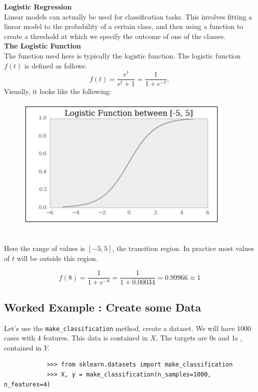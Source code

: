 \documentclass[SKL-MASTER.tex]{subfiles}
\begin{document}
	\LARGE
	\noindent \textbf{Logistic Regression}\\
	Linear models can actually be used for classification tasks. This involves fitting a linear model
	to the probability of a certain class, and then using a function to create a threshold at which
	we specify the outcome of one of the classes. \\ 
	
	\bigskip
	\noindent \textbf{The Logistic Function}\\
	The function used here is typically the logistic function. The logistic function $f(t)$ is defined as follows:
	\[ f (t) = \frac{e^t}{e^t+1} = \frac{1}{1+e^{-t}},\]
	\bigskip
	Visually, it looks like the following:
	\begin{figure}[h!]
		\centering
		\includegraphics[width=0.7\linewidth]{LogisticFunctions}
	\end{figure}\\ 
	Here the range of values is $[-5,5]$, the transition region. In practice most values of $t$ will be outside this region.
	
	\[ f (8) = \frac{1}{1+e^{-8}} = \frac{1}{1+0.00034} = 0.99966 \approx 1 \]
	
	\newpage
	\subsection*{Worked Example : Create some Data}
	Let's use the \texttt{make\_classification} method, create a dataset. We will have 1000 cases with 4 features. This data is contained in $X$. The targets are 0s and 1s , contained in $Y$.
	{
		\large
		\begin{framed}
			
			\begin{verbatim}
			>>> from sklearn.datasets import make_classification
			>>> X, y = make_classification(n_samples=1000, n_features=4)
			\end{verbatim}
		\end{framed}
	}
\end{document}

